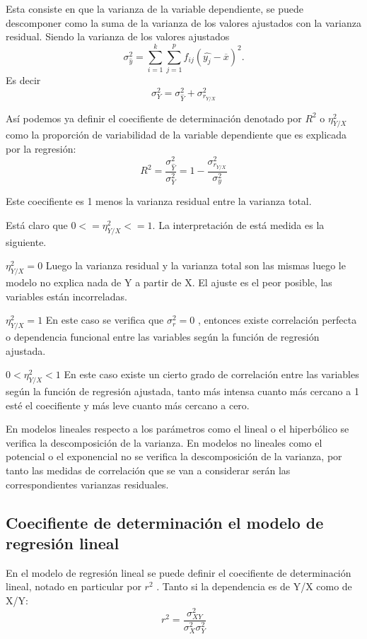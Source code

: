 \documentclass{article}
\begin{document}
	\vspace{2mm}
	
	Esta consiste en que la varianza de la variable dependiente, se puede descomponer como la suma de la varianza de los valores ajustados con la varianza residual. Siendo la varianza de los valores ajustados $$\sigma_{\hat{y}}^2 = \sum_{i=1}^k \sum_{j=1}^p f_{ij} (\hat{y_j} - \overline{x} )^2. $$
Es decir
	$$ \sigma_Y^2 = \sigma_{\hat{Y}}^2 + \sigma_{r_{Y/X}}^2 $$
	
	
	Así podemos ya definir el coecifiente de determinación denotado por $R^2$ o $\eta_{Y/X}^2$ como la proporción de variabilidad de la variable dependiente que es explicada por la regresión: $$R^2 = \frac{\sigma_{\hat{Y}}^2}{\sigma_Y^2}  = 1 - \frac{\sigma_{r_{Y/X}}^2}{\sigma_y^2}$$
	
	Este coecifiente es 1 menos la varianza residual entre la varianza total.
	
	Está claro que $ 0 <= \eta_{Y/X}^2  <= 1 $. La interpretación de está medida es la siguiente.
	
\vspace{2mm}	
	
	$ \eta_{Y/X}^2 = 0 $ Luego la varianza residual y la varianza total son las mismas luego le modelo no explica nada de Y a partir de X. El ajuste es el peor posible, las variables están incorreladas.
	
\vspace{2mm}	
	
	$ \eta_{Y/X}^2 = 1 $ En este caso se verifica que $\sigma_r^2 = 0$ , entonces existe correlación perfecta o dependencia funcional entre las variables según la función de regresión ajustada.	
	
\vspace{2mm}	
	
	$ 0 < \eta_{Y/X}^2 < 1 $  En este caso existe un cierto grado de correlación entre las variables según la función de regresión ajustada, tanto más intensa cuanto más cercano a 1 esté el coecifiente y más leve cuanto más cercano a cero.
	
En modelos lineales respecto a los parámetros como el lineal o el hiperbólico se verifica la descomposición de la varianza. En modelos no lineales como el potencial o el exponencial no se verifica la descomposición de la varianza, por tanto las medidas de correlación que se van a considerar serán las correspondientes varianzas residuales.


\subsection{Coecifiente de determinación el modelo de regresión lineal}
En el modelo de regresión lineal se puede definir el coecifiente de determinación lineal, notado en particular por $r^2$ . Tanto si la dependencia es de Y/X como de X/Y:
$$ r^2 = \frac{\sigma_{XY}^2}{ \sigma_{X}^2 \sigma_{Y}^2 } $$
\end{document}
